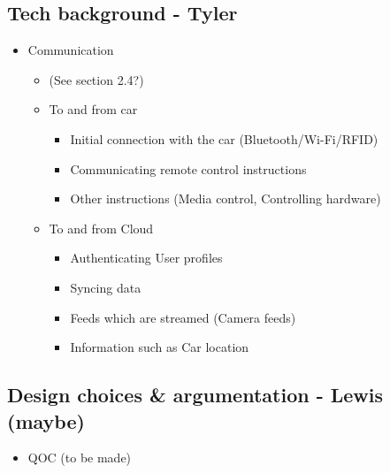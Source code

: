 \documentclass{article}
\begin{document}
\subsection{Tech background - Tyler}\label{ssec:app-tech}
	\begin{itemize}
		\item Communication
        \begin{itemize}
        	\item (See section 2.4?)
        	\item To and from car
            \begin{itemize}
            	\item Initial connection with the car (Bluetooth/Wi-Fi/RFID)
                \item Communicating remote control instructions
                \item Other instructions (Media control, Controlling hardware)
            \end{itemize}
            \item To and from Cloud
            \begin{itemize}
            	\item Authenticating User profiles
                \item Syncing data
                \item Feeds which are streamed (Camera feeds)
                \item Information such as Car location
            \end{itemize}
        \end{itemize}
	\end{itemize}

\subsection{Design choices \& argumentation - Lewis (maybe)}\label{ssec:app-design}
  \begin{itemize}
    \item QOC (to be made)
  \end{itemize}
\end{document}
